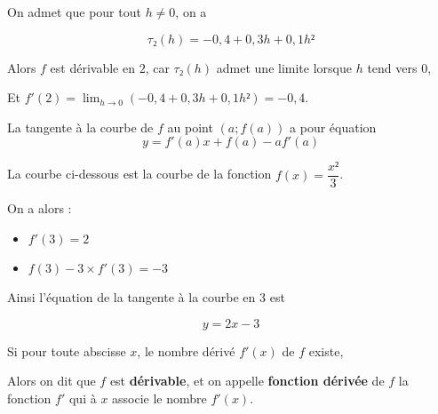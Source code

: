 \documentclass[
	classe=$1^{ere}STI2D$,
	headerTitle=Cours\space Chapitre\space 5
]{coursclass}
\begin{document}
\begin{exemple}
\begin{itemize}
		      On admet que pour tout $h ≠ 0$, on a

		      $$ τ₂(h) = -0,4 + 0,3h + 0,1h² $$

		      Alors $f$ est dérivable en $2$, car $τ₂(h)$ admet une limite lorsque $h$ tend vers $0$,

		      Et $f'(2) = \lim_{h→0}(-0,4 + 0,3h + 0,1h²) = -0,4$.
	\end{itemize}
\end{exemple}

\begin{propriete}
	La tangente à la courbe de $f$ au point $(a ; f(a))$ a pour équation
	$$ y = f'(a)x + f(a) - af'(a) $$
\end{propriete}

\begin{exemple}
	La courbe ci-dessous est la courbe de la fonction $f(x) = \dfrac{x²}{3}$.

	\begin{center}

	\end{center}

	On a alors :

	\begin{itemize}
		\item $f'(3) = 2$
		\item $f(3) - 3 × f'(3) = -3$
	\end{itemize}

	Ainsi l'équation de la tangente à la courbe en $3$ est

	$$ y = 2x - 3 $$
\end{exemple}

\begin{definition}
	Si pour toute abscisse $x$, le nombre dérivé $f'(x)$ de $f$ existe, \bigskip

	Alors on dit que $f$ est \textbf{dérivable}, et on appelle \textbf{fonction dérivée} de $f$ la fonction $f'$ qui à $x$ associe le nombre $f'(x)$.
\end{definition}
\end{document}
